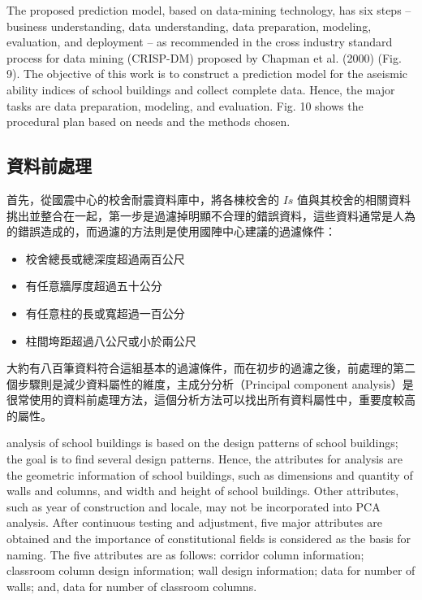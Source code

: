 The proposed prediction model, based on data-mining technology, has six steps – business understanding, data understanding, data preparation, modeling, evaluation, and deployment – as recommended in the cross industry standard process for data mining (CRISP-DM) proposed by Chapman et al. (2000) (Fig. 9). The objective of this work is to construct a prediction model for the aseismic ability indices of school buildings and collect complete data. Hence, the major tasks are data preparation, modeling, and evaluation. Fig. 10 shows the procedural plan based on needs and the methods chosen. 

\subsection{資料前處理}

首先，從國震中心的校舍耐震資料庫中，將各棟校舍的 $Is$ 值與其校舍的相關資料挑出並整合在一起，第一步是過濾掉明顯不合理的錯誤資料，這些資料通常是人為的錯誤造成的，而過濾的方法則是使用國陣中心建議的過濾條件：

\begin{itemize}
\item 校舍總長或總深度超過兩百公尺
\item 有任意牆厚度超過五十公分
\item 有任意柱的長或寬超過一百公分
\item 柱間垮距超過八公尺或小於兩公尺
\end{itemize}

大約有八百筆資料符合這組基本的過濾條件，而在初步的過濾之後，前處理的第二個步驟則是減少資料屬性的維度，主成分分析（Principal component analysis）是很常使用的資料前處理方法，這個分析方法可以找出所有資料屬性中，重要度較高的屬性。

analysis of school buildings is based on the design patterns of school buildings; the goal is to find several design patterns. Hence, the attributes for analysis are the geometric information of school buildings, such as dimensions and quantity of walls and columns, and width and height of school buildings. Other attributes, such as year of construction and locale, may not be incorporated into PCA analysis. After continuous testing and adjustment, five major attributes are obtained and the importance of constitutional fields is considered as the basis for naming. The five attributes are as follows: corridor column information; classroom column design information; wall design information; data for number of walls; and, data for number of classroom columns.

